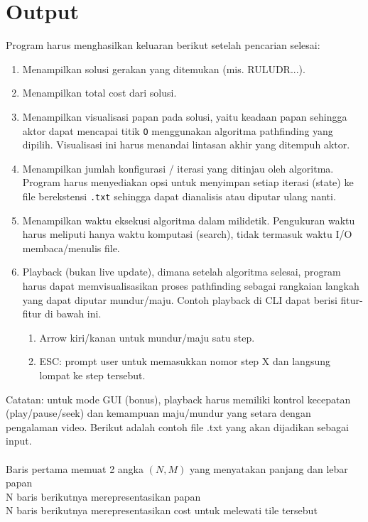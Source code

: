 \section{Output}

Program harus menghasilkan keluaran berikut setelah pencarian selesai:
\begin{enumerate}
    \item Menampilkan solusi gerakan yang ditemukan (mis. RULUDR...).
    \item Menampilkan total cost dari solusi.
    \item Menampilkan visualisasi papan pada solusi, yaitu keadaan papan sehingga aktor dapat mencapai titik \texttt{O} menggunakan algoritma pathfinding yang dipilih. Visualisasi ini harus menandai lintasan akhir yang ditempuh aktor.
    \item Menampilkan jumlah konfigurasi / iterasi yang ditinjau oleh algoritma. Program harus menyediakan opsi untuk menyimpan setiap iterasi (state) ke file berekstensi \texttt{.txt} sehingga dapat dianalisis atau diputar ulang nanti.
    \item Menampilkan waktu eksekusi algoritma dalam milidetik. Pengukuran waktu harus meliputi hanya waktu komputasi (search), tidak termasuk waktu I/O membaca/menulis file.
    \item Playback (bukan live update), dimana setelah algoritma selesai, program harus dapat memvisualisasikan proses pathfinding sebagai rangkaian langkah yang dapat diputar mundur/maju. Contoh playback di CLI dapat berisi fitur-fitur di bawah ini.
          \begin{enumerate}
              \item Arrow kiri/kanan untuk mundur/maju satu step.
              \item ESC: prompt user untuk memasukkan nomor step X dan langsung lompat ke step tersebut.
          \end{enumerate}
\end{enumerate}

Catatan: untuk mode GUI (bonus), playback harus memiliki kontrol kecepatan (play/pause/seek) dan kemampuan maju/mundur yang setara dengan pengalaman video. Berikut adalah contoh file .txt yang akan dijadikan sebagai input.
\\ \\
Baris pertama memuat 2 angka $(N, M)$ yang menyatakan panjang dan lebar papan \\
N baris berikutnya merepresentasikan papan \\
N baris berikutnya merepresentasikan cost untuk melewati tile tersebut \\

